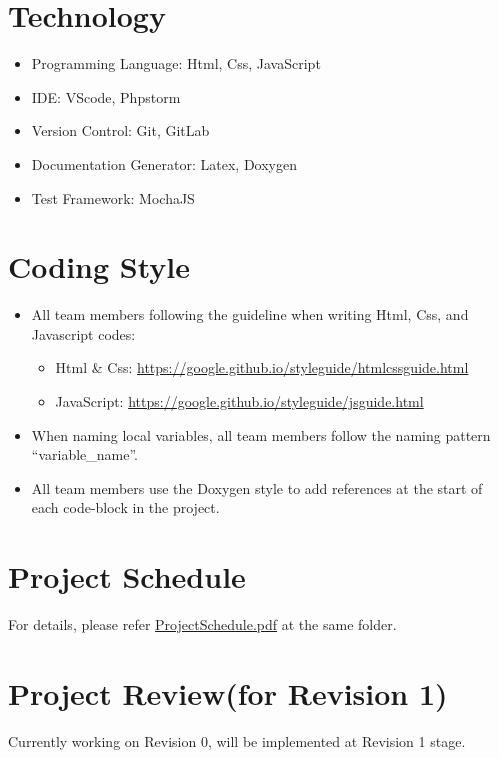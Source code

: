 \documentclass[11pt, letterpaper]{article}
\begin{document}
\section{Technology}
\begin{itemize}
	\item Programming Language: Html, Css, JavaScript
	\item IDE: VScode, Phpstorm
	\item Version Control: Git, GitLab
	\item Documentation Generator: Latex, Doxygen
	\item Test Framework: MochaJS
\end{itemize}

\section{Coding Style}
\begin{itemize}
	\item All team members following the guideline when writing Html, Css, and Javascript codes:
		\begin{itemize}
			\item Html \& Css: \url{https://google.github.io/styleguide/htmlcssguide.html}
			\item JavaScript: \url{https://google.github.io/styleguide/jsguide.html}
		\end{itemize}
	\item When naming local variables, all team members follow the naming pattern “variable\_name”.
	\item All team members use the Doxygen style to add references at the start of each code-block in the project.
\end{itemize}

\section{Project Schedule}
For details, please refer \href{run:./ProjectSchedule.pdf}{ProjectSchedule.pdf} at the same folder.

\section{Project Review(for Revision 1)}
Currently working on Revision 0, will be implemented at Revision 1 stage.
\end{document}

